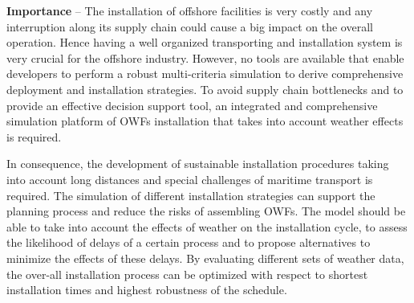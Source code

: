 \textbf{Importance} --
The installation of offshore facilities is very costly and any interruption along its supply chain could cause a big impact on the overall operation. Hence having a well organized transporting and installation system is very crucial for the offshore industry.
However, no tools are available that enable developers to perform a robust multi-criteria simulation to derive comprehensive deployment and installation strategies. To avoid supply chain bottlenecks and to provide an effective decision support tool, an integrated and comprehensive simulation platform of OWFs installation that takes into account weather effects is required.

In consequence, the development of sustainable installation procedures taking into account long distances and special challenges of maritime transport is required. The simulation of different installation strategies can support the planning process and reduce the risks of assembling OWFs. The model should be able to take into account the effects of weather on the installation cycle, to assess the likelihood of delays of a certain process and to propose alternatives to minimize the effects of these delays. By evaluating different sets of weather data, the over-all installation process can be optimized with respect to shortest installation times and highest robustness of the schedule.

